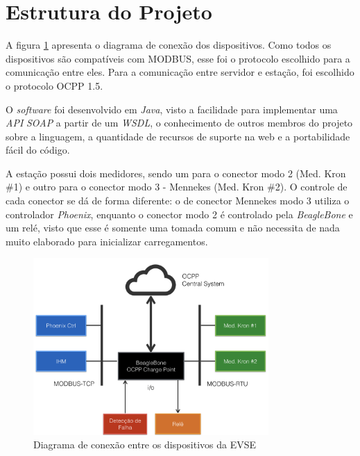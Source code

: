   \section{Estrutura do Projeto}
  \label{methodology:structure}

    A figura \ref{fig:proj-diagram} apresenta o diagrama de conexão dos dispositivos. Como todos os dispositivos são compatíveis com MODBUS, esse foi o protocolo escolhido para a comunicação entre eles. Para a comunicação entre servidor e estação, foi escolhido o protocolo \ac{OCPP} 1.5. 

    O \textit{software} foi desenvolvido em \textit{Java}, visto a facilidade para implementar uma \textit{API} \textit{\ac{SOAP}} a partir de um \textit{\ac{WSDL}}, o conhecimento de outros membros do projeto sobre a linguagem, a quantidade de recursos de suporte na web e a portabilidade fácil do código.

    A estação possui dois medidores, sendo um para o conector modo 2 (Med. Kron \#1) e outro para o conector modo 3 - Mennekes (Med. Kron \#2). O controle de cada conector se dá de forma diferente: o de conector Mennekes modo 3 utiliza o controlador \textit{Phoenix}, enquanto o conector modo 2 é controlado pela \textit{BeagleBone} e um relé, visto que esse é somente uma tomada comum e não necessita de nada muito elaborado para inicializar carregamentos.

    \begin{figure}[H]
      \begin{center}
        \includegraphics[width=0.8\textwidth,natwidth=400,natheight=288]{assets/images/devices-diagram.png}
        \caption{Diagrama de conexão entre os dispositivos da EVSE}
        \label{fig:proj-diagram}
      \end{center}
    \end{figure}

